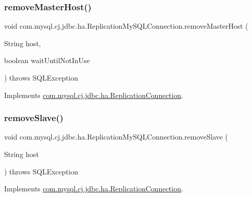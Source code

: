 \subsubsection{\texorpdfstring{remove\+Master\+Host()}{removeMasterHost()}\hspace{0.1cm}{\footnotesize\ttfamily [2/2]}}
{\footnotesize\ttfamily void com.\+mysql.\+cj.\+jdbc.\+ha.\+Replication\+My\+S\+Q\+L\+Connection.\+remove\+Master\+Host (\begin{DoxyParamCaption}\item[{String}]{host,  }\item[{boolean}]{wait\+Until\+Not\+In\+Use }\end{DoxyParamCaption}) throws S\+Q\+L\+Exception}



Implements \mbox{\hyperlink{interfacecom_1_1mysql_1_1cj_1_1jdbc_1_1ha_1_1_replication_connection_a47341136bcee35fd889a2d568e375756}{com.\+mysql.\+cj.\+jdbc.\+ha.\+Replication\+Connection}}.

\mbox{\label{classcom_1_1mysql_1_1cj_1_1jdbc_1_1ha_1_1_replication_my_s_q_l_connection_a2de6631ba38ed04c74adf82445618d17}} 
\subsubsection{\texorpdfstring{remove\+Slave()}{removeSlave()}\hspace{0.1cm}{\footnotesize\ttfamily [1/2]}}
{\footnotesize\ttfamily void com.\+mysql.\+cj.\+jdbc.\+ha.\+Replication\+My\+S\+Q\+L\+Connection.\+remove\+Slave (\begin{DoxyParamCaption}\item[{String}]{host }\end{DoxyParamCaption}) throws S\+Q\+L\+Exception}



Implements \mbox{\hyperlink{interfacecom_1_1mysql_1_1cj_1_1jdbc_1_1ha_1_1_replication_connection_a26c4c17241b8e9169e88484ba26bf081}{com.\+mysql.\+cj.\+jdbc.\+ha.\+Replication\+Connection}}.

